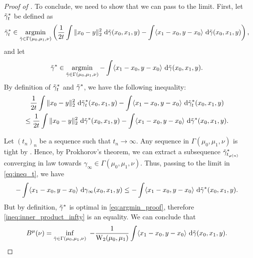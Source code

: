 \documentclass[twoside]{article}
\DeclareMathOperator*{\argmin}{argmin}
\newcommand{\W}{\mathrm{W}}
\begin{document}
\begin{proof}[Proof of ]
    To conclude, we need to show that we can pass to the limit. First, let $\Tilde{\gamma}_t^*$ be defined as
    \begin{equation}
        \Tilde{\gamma}_t^*\in\argmin_{\Tilde{\gamma}\in\Gamma(\mu_0,\mu_1,\nu)} \left(\frac{1}{2t}\int \|x_0-y\|_2^2 \ \mathrm{d}\Tilde{\gamma}(x_0,x_1,y) - \int \langle x_1-x_0, y-x_0\rangle\ \mathrm{d}\Tilde{\gamma}(x_0,x_1,y)\right),
    \end{equation}
    and let
    \begin{equation}\label{eq:argmin_proof}
        \Tilde{\gamma}^*\in\argmin_{\Tilde{\gamma}\in\Gamma(\mu_0,\mu_1,\nu)}  - \int \langle x_1-x_0, y-x_0\rangle\ \mathrm{d}\Tilde{\gamma}(x_0,x_1,y).
    \end{equation}
    By definition of $\Tilde{\gamma}_t^*$ and $\Tilde{\gamma}^*$, we have the following inequality:
    \begin{multline} \label{eq:ineq_t}
        \frac{1}{2t}\int \|x_0-y\|_2^2 \ \mathrm{d}\Tilde{\gamma}_t^*(x_0,x_1,y) - \int \langle x_1-x_0, y-x_0\rangle\ \mathrm{d}\Tilde{\gamma}_t^*(x_0,x_1,y) \\ \le \frac{1}{2t}\int \|x_0-y\|_2^2 \ \mathrm{d}\Tilde{\gamma}^*(x_0,x_1,y) - \int \langle x_1-x_0, y-x_0\rangle\ \mathrm{d}\Tilde{\gamma}^*(x_0,x_1,y).
    \end{multline}

    Let $(t_n)_n$ be a sequence such that $t_n\to \infty$. Any sequence in $\Gamma(\mu_0,\mu_1,\nu)$ is tight by . 
    Hence, by Prokhorov's theorem, we can extract a subsequence $\Tilde{\gamma}_{t_{\varphi(n)}}^*$ converging in law towards $\gamma_\infty\in\Gamma(\mu_0,\mu_1,\nu)$. Thus, passing to the limit in \eqref{eq:ineq_t}, we have
    \begin{equation}\label{ineq:inner_product_infty}
        -\int \langle x_1-x_0, y-x_0\rangle\ \mathrm{d}\gamma_\infty(x_0,x_1,y) \le -\int \langle x_1-x_0, y-x_0\rangle\ \mathrm{d}\Tilde{\gamma}^*(x_0,x_1,y).
    \end{equation}
    But by definition, $\Tilde{\gamma}^*$ is optimal in \eqref{eq:argmin_proof}, therefore \eqref{ineq:inner_product_infty} is an equality. We can conclude that
    \begin{equation}
        B^\mu(\nu) = \inf_{\Tilde{\gamma}\in\Gamma(\mu_0,\mu_1,\nu)}\ -\frac{1}{\W_2(\mu_0,\mu_1)} \int \langle x_1-x_0,y-x_0\rangle\ \mathrm{d}\Tilde{\gamma}(x_0,x_1,y).
    \end{equation}
\end{proof}
\end{document}
